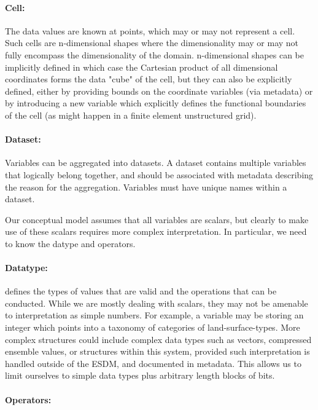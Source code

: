 \paragraph{Cell:}%
\label{cell}

The data values are known at points, which may or may not represent a cell. 
Such cells are n-dimensional shapes where the dimensionality may or may not fully encompass the dimensionality of the domain.
n-dimensional shapes can be implicitly defined in which case the Cartesian product of all dimensional coordinates forms the data "cube" of the cell, but they can also be explicitly defined, either by providing bounds on the coordinate variables (via metadata) or by introducing a new variable which explicitly defines the functional boundaries of the cell (as might happen in a finite element unstructured
grid).

\paragraph{Dataset:}%
\label{dataset}

Variables can be aggregated into datasets. 
A dataset contains multiple variables that logically belong together, and should be associated with metadata describing the reason for the aggregation. 
Variables must have unique names within a dataset.

Our conceptual model assumes that all variables are scalars, but clearly to make use of these scalars requires more complex interpretation. 
In particular, we need to know the datype and operators.

\paragraph{Datatype:}%
\label{datatype}

defines the types of values that are valid and the operations that can be conducted. 
While we are mostly dealing with scalars, they may not be amenable to interpretation as simple numbers. 
For example, a variable may be storing an integer which points into a taxonomy of categories of land-surface-types. 
More complex structures could include complex data types such as vectors, compressed ensemble values, or structures within this system, provided such interpretation is handled outside of the ESDM, and documented in metadata. 
This allows us to limit ourselves to simple data types plus arbitrary length blocks of bits.

\paragraph{Operators:}%
\label{operators}


